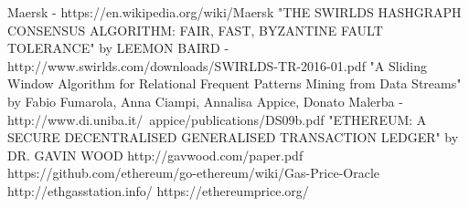 \begin{thebibliography}{1}

 Maersk - https://en.wikipedia.org/wiki/Maersk
"THE SWIRLDS HASHGRAPH CONSENSUS ALGORITHM:
FAIR, FAST, BYZANTINE FAULT TOLERANCE" by
LEEMON BAIRD - http://www.swirlds.com/downloads/SWIRLDS-TR-2016-01.pdf
 "A Sliding Window Algorithm for Relational
Frequent Patterns Mining from Data Streams" by Fabio Fumarola, Anna Ciampi, Annalisa Appice, Donato Malerba - http://www.di.uniba.it/~appice/publications/DS09b.pdf
"ETHEREUM: A SECURE DECENTRALISED GENERALISED TRANSACTION LEDGER" by DR. GAVIN WOOD http://gavwood.com/paper.pdf
https://github.com/ethereum/go-ethereum/wiki/Gas-Price-Oracle
 http://ethgasstation.info/
https://ethereumprice.org/
\end{thebibliography}